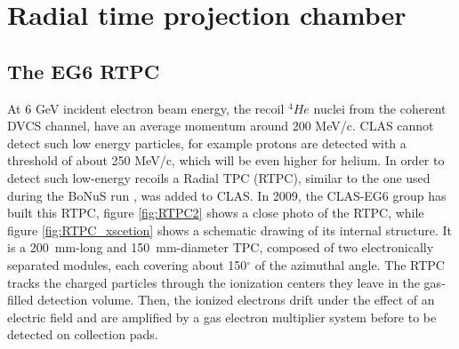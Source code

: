 \chapter{Radial time projection chamber}


\section{The EG6 RTPC}

At 6 GeV incident electron beam energy, the recoil $^{4}He$ nuclei from 
the coherent DVCS channel, have an average momentum around 200 MeV/c. CLAS 
cannot detect such low energy particles, for example protons are detected with 
a threshold of about 250 MeV/c, which will be even higher for helium. In order 
to detect such low-energy recoils a Radial TPC (RTPC), similar to the one used 
during the BoNuS run \cite{BONUS}, was added to CLAS. In 2009, the CLAS-EG6 
group \cite{proposal} has built this RTPC, figure \ref{fig:RTPC2} shows a close 
photo of the RTPC, while figure \ref{fig:RTPC_xscetion} shows a schematic 
drawing of its internal structure. It is a 200~mm-long and 150~mm-diameter TPC, 
composed of two electronically separated modules, each covering about 
150$^{\circ}$ of the azimuthal angle. The RTPC tracks the charged particles 
through the ionization centers they leave in the gas-filled detection volume.  
Then, the ionized electrons drift under the effect of an electric field and are 
amplified by a gas electron multiplier system before to be detected on 
collection pads.


